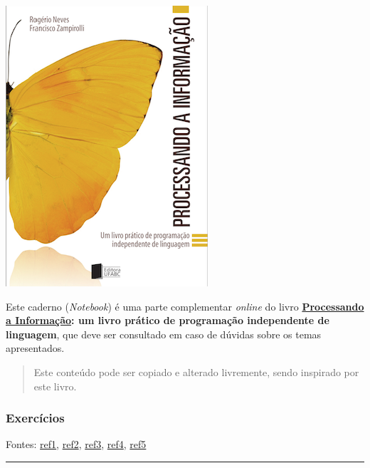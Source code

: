 \documentclass[12pt,a4paper]{article}
\renewcommand{\linethickness}{0.05em}
\begin{document}
    \includegraphics{"figs/Capa_Processando_Informacao.jpg"}

Este caderno (\emph{Notebook}) é uma parte complementar \emph{online} do
livro
\textbf{\href{https://editora.ufabc.edu.br/matematica-e-ciencias-da-computacao/58-processando-a-informacao}{Processando
a Informação}: um livro prático de programação independente de
linguagem}, que deve ser consultado em caso de dúvidas sobre os temas
apresentados.

\begin{quote}
Este conteúdo pode ser copiado e alterado livremente, sendo inspirado
por este livro.
\end{quote}

    \hypertarget{exercuxedcios}{%
\subsubsection{Exercícios}\label{exercuxedcios}}

Fontes:
\href{http://www.deinf.ufma.br/~csalles/prog/prog_lista2.pdf}{ref1},
\href{http://www.sistemas24horas.com.br/aulas/files_dic1/lista-exercicios-vetores-1.pdf}{ref2},
\href{https://fit.faccat.br/~fpereira/apostilas/exerc_resp_alg_mar2007.pdf}{ref3},
\href{https://docplayer.com.br/54457072-Laboratorio-de-programacao-a-exercicios-sobre-vetores-e-matrizes.html}{ref4},
\href{https://docplayer.com.br/21195395-Exercicios-vetores-e-matrizes.html}{ref5}

    \begin{center}\rule{0.5\linewidth}{\linethickness}\end{center}
\end{document}
